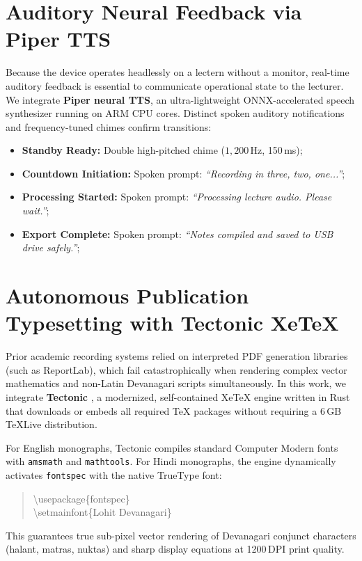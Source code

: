 \documentclass[11pt,a4paper,oneside]{report}
\begin{document}
\section{Auditory Neural Feedback via Piper TTS}
Because the device operates headlessly on a lectern without a monitor, real-time auditory feedback is essential to communicate operational state to the lecturer. We integrate \textbf{Piper neural TTS}, an ultra-lightweight ONNX-accelerated speech synthesizer running on ARM CPU cores. Distinct spoken auditory notifications and frequency-tuned chimes confirm transitions:
\begin{itemize}[noitemsep]
    \item \textbf{Standby Ready:} Double high-pitched chime ($1,200$\,Hz, 150\,ms);
    \item \textbf{Countdown Initiation:} Spoken prompt: \textit{``Recording in three, two, one...''};
    \item \textbf{Processing Started:} Spoken prompt: \textit{``Processing lecture audio. Please wait.''};
    \item \textbf{Export Complete:} Spoken prompt: \textit{``Notes compiled and saved to USB drive safely.''};
\end{itemize}

\section{Autonomous Publication Typesetting with Tectonic XeTeX}
Prior academic recording systems relied on interpreted PDF generation libraries (such as ReportLab), which fail catastrophically when rendering complex vector mathematics and non-Latin Devanagari scripts simultaneously. In this work, we integrate \textbf{Tectonic} \cite{tectonic2024}, a modernized, self-contained XeTeX engine written in Rust that downloads or embeds all required TeX packages without requiring a 6\,GB TeXLive distribution.

For English monographs, Tectonic compiles standard Computer Modern fonts with \texttt{amsmath} and \texttt{mathtools}. For Hindi monographs, the engine dynamically activates \texttt{fontspec} with the native TrueType font:
\begin{quote}
\small\ttfamily
\textbackslash usepackage\{fontspec\}\\
\textbackslash setmainfont\{Lohit Devanagari\}
\end{quote}
This guarantees true sub-pixel vector rendering of Devanagari conjunct characters (halant, matras, nuktas) and sharp display equations at 1200\,DPI print quality.
\end{document}
